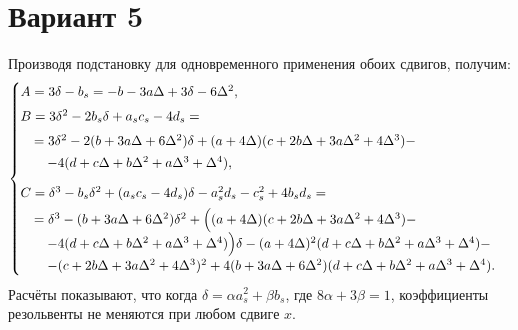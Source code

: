 \documentclass{article}
\begin{document}
\section*{Вариант 5}

Производя подстановку для одновременного применения обоих сдвигов, получим:
\[
\begin{cases}
A = 3\delta - b_s = -b - 3a\Delta + 3\delta - 6\Delta^2, \\[4pt]
B = 3\delta^2 - 2b_s\delta + a_s c_s - 4d_s = \\[4pt]
\quad = 3\delta^2 - 2(b + 3a\Delta + 6\Delta^2)\delta + (a + 4\Delta)(c + 2b\Delta + 3a\Delta^2 + 4\Delta^3) - \\[2pt]
\quad \quad - 4(d + c\Delta + b\Delta^2 + a\Delta^3 + \Delta^4), \\[8pt]
C = \delta^3 - b_s\delta^2 + (a_s c_s - 4d_s)\delta - a_s^2 d_s - c_s^2 + 4b_s d_s = \\[4pt]
\quad = \delta^3 - (b + 3a\Delta + 6\Delta^2)\delta^2 + \Bigl((a + 4\Delta)(c + 2b\Delta + 3a\Delta^2 + 4\Delta^3) - \\[2pt]
\quad \quad - 4(d + c\Delta + b\Delta^2 + a\Delta^3 + \Delta^4)\Bigr)\delta - (a + 4\Delta)^2(d + c\Delta + b\Delta^2 + a\Delta^3 + \Delta^4) - \\[2pt]
\quad \quad - (c + 2b\Delta + 3a\Delta^2 + 4\Delta^3)^2 + 4(b + 3a\Delta + 6\Delta^2)(d + c\Delta + b\Delta^2 + a\Delta^3 + \Delta^4).
\end{cases}
\]
Расчёты показывают, что когда $\delta = \alpha a_s^2 + \beta b_s$, где $8\alpha + 3\beta = 1$, коэффициенты резольвенты не меняются при любом сдвиге $x$.
\end{document}

